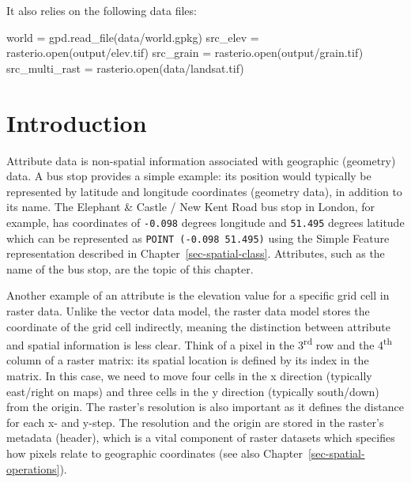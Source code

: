 \documentclass[
  letterpaper,
]{krantz}
\newenvironment{Shaded}{\begin{snugshade}}{\end{snugshade}}
\newcommand{\BuiltInTok}[1]{\textcolor[rgb]{0.00,0.23,0.31}{#1}}
\newcommand{\NormalTok}[1]{\textcolor[rgb]{0.00,0.23,0.31}{#1}}
\newcommand{\OperatorTok}[1]{\textcolor[rgb]{0.37,0.37,0.37}{#1}}
\newcommand{\StringTok}[1]{\textcolor[rgb]{0.13,0.47,0.30}{#1}}
\begin{document}
It also relies on the following data files:

\begin{Shaded}
\begin{Highlighting}[]
\NormalTok{world }\OperatorTok{=}\NormalTok{ gpd.read\_file(}\StringTok{\textquotesingle{}data/world.gpkg\textquotesingle{}}\NormalTok{)}
\NormalTok{src\_elev }\OperatorTok{=}\NormalTok{ rasterio.}\BuiltInTok{open}\NormalTok{(}\StringTok{\textquotesingle{}output/elev.tif\textquotesingle{}}\NormalTok{)}
\NormalTok{src\_grain }\OperatorTok{=}\NormalTok{ rasterio.}\BuiltInTok{open}\NormalTok{(}\StringTok{\textquotesingle{}output/grain.tif\textquotesingle{}}\NormalTok{)}
\NormalTok{src\_multi\_rast }\OperatorTok{=}\NormalTok{ rasterio.}\BuiltInTok{open}\NormalTok{(}\StringTok{\textquotesingle{}data/landsat.tif\textquotesingle{}}\NormalTok{)}
\end{Highlighting}
\end{Shaded}

\section{Introduction}\label{introduction-1}

Attribute data is non-spatial information associated with geographic
(geometry) data. A bus stop provides a simple example: its position
would typically be represented by latitude and longitude coordinates
(geometry data), in addition to its name. The Elephant \& Castle / New
Kent Road bus stop in London, for example, has coordinates of
\texttt{-0.098} degrees longitude and \texttt{51.495} degrees latitude
which can be represented as \texttt{POINT\ (-0.098\ 51.495)} using the
Simple Feature representation described in
Chapter~\ref{sec-spatial-class}. Attributes, such as the name of the bus
stop, are the topic of this chapter.

Another example of an attribute is the elevation value for a specific
grid cell in raster data. Unlike the vector data model, the raster data
model stores the coordinate of the grid cell indirectly, meaning the
distinction between attribute and spatial information is less clear.
Think of a pixel in the 3\textsuperscript{rd} row and the
4\textsuperscript{th} column of a raster matrix: its spatial location is
defined by its index in the matrix. In this case, we need to move four
cells in the x direction (typically east/right on maps) and three cells
in the y direction (typically south/down) from the origin. The raster's
resolution is also important as it defines the distance for each x- and
y-step. The resolution and the origin are stored in the raster's
metadata (header), which is a vital component of raster datasets which
specifies how pixels relate to geographic coordinates (see also
Chapter~\ref{sec-spatial-operations}).
\end{document}
